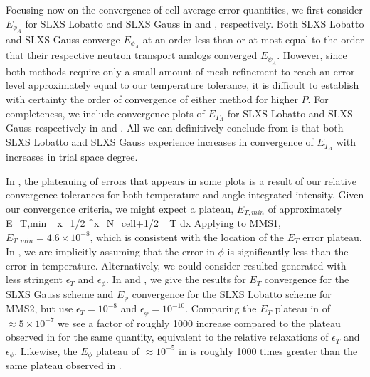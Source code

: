 Focusing now on the convergence of cell average error quantities, we first consider $E_{\phi_A}$ for SLXS Lobatto and SLXS Gauss in  and , respectively.
Both SLXS Lobatto and SLXS Gauss converge $E_{\phi_A}$ at an order less than or at most equal to the order that their respective neutron transport analogs converged $E_{\psi_A}$.
However, since both methods require only a small amount of mesh refinement to reach an error level approximately equal to our temperature tolerance, it is difficult to establish with certainty the order of convergence of either method for higher $P$.
For completeness, we include convergence plots of $E_{T_A}$ for SLXS Lobatto and SLXS Gauss respectively in  and .
All we can definitively conclude from  is that both SLXS Lobatto and SLXS Gauss experience increases in convergence of $E_{T_A}$ with increases in trial space degree.

In , the plateauing of errors that appears in some plots is a result of our relative convergence tolerances for both temperature and angle integrated intensity. 
Given our convergence criteria, we might expect a plateau, $E_{T,min}$ of approximately
\benum
E_{T,min} \int_{x_{1/2} }^{x_{N_{cell}+1/2}}{ \epsilon_T  dx} \pep
\label{eq:err_plateau}
\eenum
Applying  to MMS1, $E_{T,min} = 4.6\times 10^{-8}$, which is consistent with the location of the $E_T$ error plateau.
In , we are implicitly assuming that the error in $\phi$ is significantly less than the error in temperature. 
Alternatively, we could consider resulted generated with less stringent $\epsilon_T$ and $\epsilon_{\phi}$.
In  and , we give the results for $E_{T}$ convergence for the SLXS Gauss scheme and $E_{\phi}$ convergence for the SLXS Lobatto scheme for MMS2, but use $\epsilon_T=10^{-8}$ and $\epsilon_{\phi} = 10^{-10}$.  
Comparing the $E_T$ plateau in  of $\approx 5 \times 10^{-7}$ we see a factor of roughly 1000 increase compared to the plateau observed in 
 for the same quantity, equivalent to the relative relaxations of $\epsilon_T$ and $\epsilon_{\phi}$.
Likewise, the $E_{\phi}$ plateau of $\approx 10^{-5}$ in  is roughly 1000 times greater than the same plateau observed in .

